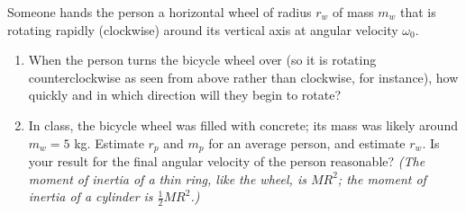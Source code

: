 \documentclass[12pt]{article}
\begin{document}
\begin{enumerate}
Someone hands the person a horizontal wheel of radius $r_w$ of mass $m_w$ that is rotating rapidly (clockwise) around its vertical axis at angular velocity $\omega_0$.

\begin{enumerate}
	\item When the person turns the bicycle wheel over (so it is rotating counterclockwise as seen from above rather than clockwise, for instance), how quickly and in which direction will they begin to rotate?
	
	\item In class, the bicycle wheel was filled with concrete; its mass was likely around $m_w = 5$ kg. Estimate $r_p$ and $m_p$ for an average person, and estimate $r_w$. Is your result for the final angular velocity of the person reasonable? {\it (The moment of inertia of a thin ring, like the wheel, is $MR^2$; the moment of inertia of a cylinder is $\frac{1}{2}MR^2$.)}
\end{enumerate}



\end{enumerate}
\end{document}

